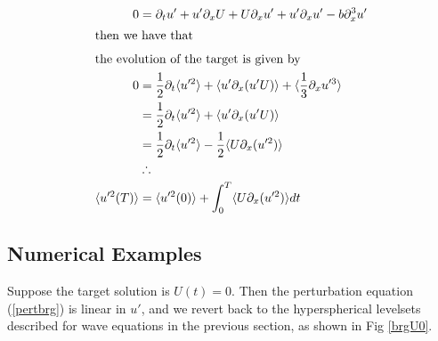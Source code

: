 \documentclass[longbibliography,amsmath,amssymb,aps,nofootinbib]{revtex4-2}
\newcommand{\davg}[1]{\langle {#1} \rangle}
\begin{document}
\begin{align}
  0 &= \partial_t u' + u'\partial_x U + U\partial_x u' + u'\partial_x u' - b\partial_x^3 u'\label{pertbrg}\\
  \intertext{then we have that}
  \intertext{the evolution of the target is given by}
  0 &= \frac{1}{2}\partial_t \davg{u'^2} + \davg{u' \partial_x (u'U)} + \davg{\frac{1}{3}\partial_x u'^3} \nonumber \\
  &= \frac{1}{2}\partial_t \davg{u'^2} +  \davg{u' \partial_x (u'U)} \nonumber \\
  &= \frac{1}{2}\partial_t \davg{u'^2} - \frac{1}{2}\davg{U \partial_x (u'^2)} \nonumber \\
  &\therefore\nonumber\\
  \davg{u'^2(T)} &= \davg{u'^2(0)} + \int_0^T \davg{U \partial_x (u'^2)} dt \label{objburgeq}
\end{align}

\subsection*{Numerical Examples}
Suppose the target solution is $U(t) = 0$. Then the perturbation equation (\ref{pertbrg}) is linear in $u'$, and we revert back to the hyperspherical levelsets described for wave equations in the previous section, as shown in Fig \ref{brgU0}.
\end{document}
